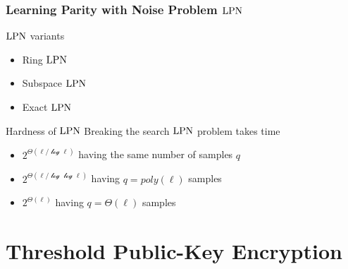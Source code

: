 \begin{frame}
 \frametitle{Learning Parity with Noise Problem $\mathrm{LPN}$}

  \begin{block}{$\mathrm{LPN}$ variants}
    \begin{itemize}
      \item Ring $\mathrm{LPN}$
      \item Subspace $\mathrm{LPN}$
      \item Exact $\mathrm{LPN}$
    \end{itemize} 
  \end{block}

  \begin{block}{Hardness of $\mathrm{LPN}$}
  Breaking the search $\mathrm{LPN}$ problem takes time
  \begin{itemize}
   \item $2^{\mathcal{\varTheta}(\mathcal{\ell / \log{\ell}})}$ having the same number of samples $q$
   \item $2^{\mathcal{\varTheta}(\mathcal{\ell / \log{ \log {\ell} } })}$ having $q=poly(\ell)$ samples
   \item $2^{\mathcal{\varTheta}(\mathcal{\ell})}$ having $q= \mathcal{\varTheta}(\ell)$ samples
  \end{itemize}

  \end{block}


\end{frame}

\section{Threshold Public-Key Encryption}


